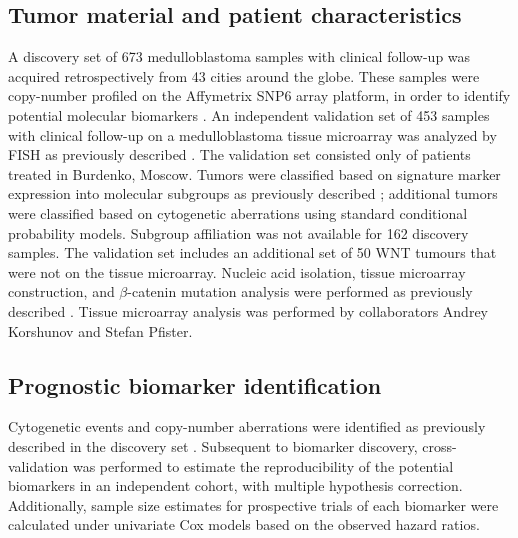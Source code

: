 \subsection{Tumor material and patient characteristics}

A discovery set of 673 medulloblastoma samples with clinical follow-up was acquired retrospectively from 43 cities around the globe. These samples were copy-number profiled on the Affymetrix SNP6 array platform, in order to identify potential molecular biomarkers . An independent validation set of 453 samples with clinical follow-up on a medulloblastoma tissue microarray was analyzed by FISH as previously described . The validation set consisted only of patients treated in Burdenko, Moscow. Tumors were classified based on signature marker expression into molecular subgroups as previously described ; additional tumors were classified based on cytogenetic aberrations using standard conditional probability models. Subgroup affiliation was not available for 162 discovery samples. The validation set includes an additional set of 50 WNT tumours that were not on the tissue microarray. Nucleic acid isolation, tissue microarray construction, and $\beta$-catenin mutation analysis were performed as previously described . Tissue microarray analysis was performed by collaborators Andrey Korshunov and Stefan Pfister.

\subsection{Prognostic biomarker identification}

Cytogenetic events and copy-number aberrations were identified as previously described in the discovery set . Subsequent to biomarker discovery, cross-validation was performed to estimate the reproducibility of the potential biomarkers in an independent cohort, with multiple hypothesis correction. Additionally, sample size estimates for prospective trials of each biomarker were calculated under univariate Cox models based on the observed hazard ratios.

